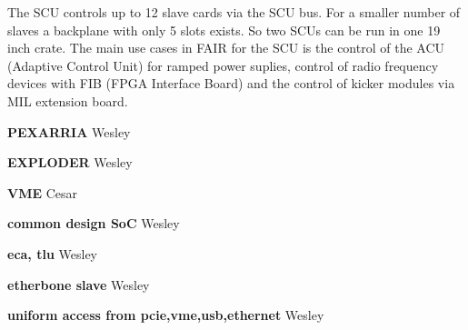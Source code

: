 The SCU controls up to 12 slave cards via the SCU bus. For a smaller
number of slaves a backplane with
only 5 slots exists. So two SCUs can be run in one 19 inch crate.
The main use cases in FAIR for the SCU is the control of the ACU
(Adaptive Control Unit) for ramped power suplies,
control of radio frequency devices with FIB (FPGA Interface Board) and
the control of kicker modules
via MIL extension board.

\textbf{PEXARRIA}
Wesley

\textbf{EXPLODER}
Wesley

\textbf{VME}
Cesar


\textbf{common design SoC}
Wesley


\textbf{eca, tlu}
Wesley


\textbf{etherbone slave}
Wesley


\textbf{uniform access from pcie,vme,usb,ethernet}
Wesley


